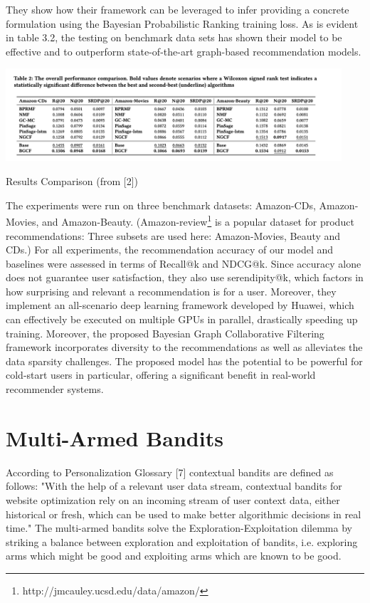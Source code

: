 They show how their framework can be leveraged to infer providing a concrete formulation using the Bayesian Probabilistic Ranking training loss. As is evident in table 3.2, the testing on benchmark data sets has shown their model to be effective and to outperform state-of-the-art graph-based recommendation models. 

\begin{table}[hh!]
    \centering
    \includegraphics[width=125mm]{BGCF_results_comparison.png}
    \caption{Results Comparison (from [2])
    \label{overflow}}
\end{table}

The experiments were run on three benchmark datasets: Amazon-CDs, Amazon-Movies, and Amazon-Beauty. (Amazon-review\footnote{ http://jmcauley.ucsd.edu/data/amazon/} is a popular dataset for product recommendations: Three subsets are used here: Amazon-Movies, Beauty and CDs.) For all experiments, the recommendation accuracy of our model and baselines were assessed in terms of Recall@k and NDCG@k. Since accuracy alone does not guarantee user satisfaction, they also use serendipity@k, which factors in how surprising and relevant a recommendation is for a user. Moreover, they implement an all-scenario deep learning framework developed by Huawei, which can effectively be executed on multiple GPUs in parallel, drastically speeding up training.  Moreover, the proposed Bayesian Graph Collaborative Filtering framework incorporates diversity to the recommendations as well as alleviates the data sparsity challenges. The proposed model has the potential to be powerful for cold-start users in particular, offering a significant benefit in real-world recommender systems. 

\chapter{Multi-Armed Bandits}
According to Personalization Glossary [7] contextual bandits are defined as follows: "With the help of a relevant user data stream, contextual bandits for website optimization rely on an incoming stream of user context data, either historical or fresh, which can be used to make better algorithmic decisions in real time."
The multi-armed bandits solve the Exploration-Exploitation dilemma by striking a balance between exploration and exploitation of bandits, i.e. exploring arms which might be good and exploiting arms which are known to be good.

